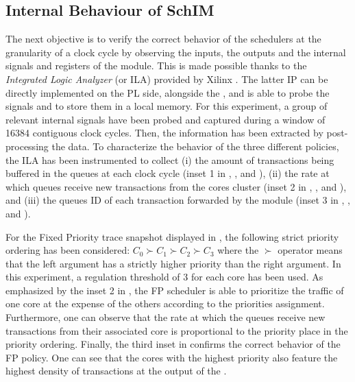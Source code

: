 \subsection{Internal Behaviour of SchIM}
\label{subsec:internal-behaviour-of-schim}
The next objective is to verify the correct behavior of the schedulers
at the granularity of a clock cycle by observing the inputs,
the outputs and the internal signals and registers of the \schim
module. This is made possible thanks to the \emph{Integrated Logic
  Analyzer} (or ILA) provided by Xilinx \cite{Xilinx-ILA}. The latter
IP can be directly implemented on the PL side, alongside the \schim,
and is able to probe the signals and to store them in a local
memory. For this experiment, a group of relevant internal signals have
been probed and captured during a window of 16384 contiguous clock
cycles. Then, the information has been extracted by post-processing
the data. To characterize the behavior of the three different
policies, the ILA has been instrumented to collect (i) the amount of
transactions being buffered in the queues at each clock cycle (inset 1
in , , and
), (ii) the rate at which queues receive
new transactions from the cores cluster (inset 2 in
, , and
), and (iii) the queues ID of each
transaction forwarded by the \schim module (inset 3 in
, , and
).

For the Fixed Priority trace snapshot displayed in
, the following strict priority ordering
has been considered: $C_{0} \succ C_{1} \succ C_{2} \succ C_{3}$ where
the $\succ$ operator means that the left argument has a strictly
higher priority than the right argument. In this experiment, a
regulation threshold of 3 for each core has been used.  As emphasized
by the inset 2 in , the FP scheduler is
able to prioritize the traffic of one core at the expense of the
others according to the priorities assignment. Furthermore, one can
observe that the rate at which the queues receive new transactions
from their associated core is proportional to the priority place in
the priority ordering.  Finally, the third inset in
 confirms the correct behavior of the FP
policy.%
One can see that the cores with the highest priority also feature the
highest density of transactions at the output of the \schim.

